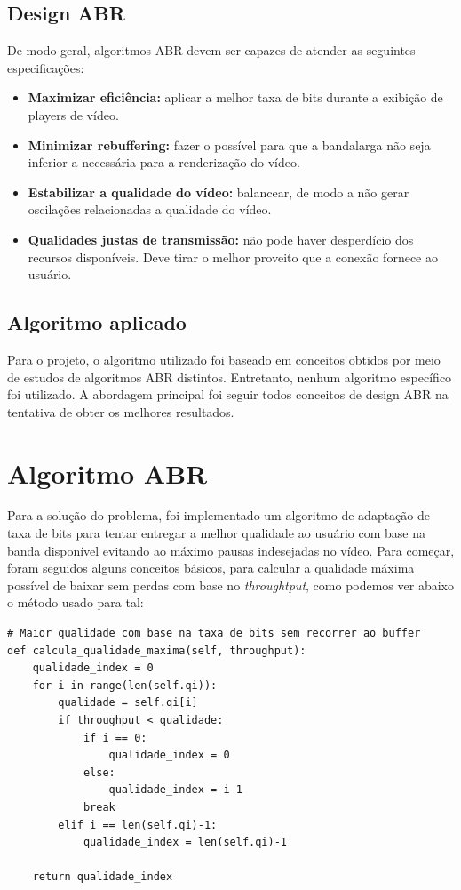 \documentclass[12pt]{article}
\begin{document}
\subsection{Design ABR}
De modo geral, algoritmos ABR devem ser capazes de atender as seguintes especificações:
\begin{itemize}
    \item \textbf{Maximizar eficiência:} aplicar a melhor taxa de bits durante a exibição de players de vídeo.
    \item \textbf{Minimizar rebuffering:} fazer o possível para que a bandalarga não seja inferior a necessária para a renderização do vídeo.
    \item \textbf{Estabilizar a qualidade do vídeo:} balancear, de modo a não gerar oscilações relacionadas a qualidade do vídeo.
    \item \textbf{Qualidades justas de transmissão:} não pode haver desperdício dos recursos disponíveis. Deve tirar o melhor proveito que a conexão fornece ao usuário.
\end{itemize}

\subsection{Algoritmo aplicado}
Para o projeto, o algoritmo utilizado foi baseado em conceitos obtidos por meio de estudos de algoritmos ABR distintos. Entretanto, nenhum algoritmo específico foi utilizado. A abordagem principal foi seguir todos conceitos de design ABR na tentativa de obter os melhores resultados.



\newpage

\section{Algoritmo ABR}
Para a solução do problema, foi implementado um algoritmo de adaptação de taxa de bits para tentar entregar a melhor qualidade ao usuário com base na banda disponível evitando ao máximo pausas indesejadas no vídeo. Para começar, foram seguidos alguns conceitos básicos, para calcular a qualidade máxima possível de baixar sem perdas com base no \textit{throughtput}, como podemos ver abaixo o método usado para tal:

\begin{lstlisting}
# Maior qualidade com base na taxa de bits sem recorrer ao buffer
def calcula_qualidade_maxima(self, throughput):
    qualidade_index = 0
    for i in range(len(self.qi)):
        qualidade = self.qi[i]
        if throughput < qualidade:
            if i == 0:
                qualidade_index = 0
            else:
                qualidade_index = i-1
            break
        elif i == len(self.qi)-1:
            qualidade_index = len(self.qi)-1

    return qualidade_index
\end{lstlisting}
\end{document}

